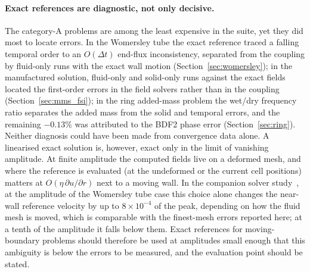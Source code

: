 \paragraph{Exact references are diagnostic, not only decisive.}
The category-A problems are among the least expensive in the suite, yet they did most to locate errors.
In the Womersley tube the exact reference traced a falling temporal order to an $O(\Delta t)$ end-flux inconsistency, separated from the coupling by fluid-only runs with the exact wall motion (Section~\ref{sec:womersley}); in the manufactured solution, fluid-only and solid-only runs against the exact fields located the first-order errors in the field solvers rather than in the coupling (Section~\ref{sec:mms_fsi}); in the ring added-mass problem the wet/dry frequency ratio separates the added mass from the solid and temporal errors, and the remaining $-0.13\%$ was attributed to the BDF2 phase error (Section~\ref{sec:ring}).
Neither diagnosis could have been made from convergence data alone.
A linearised exact solution is, however, exact only in the limit of vanishing amplitude.
At finite amplitude the computed fields live on a deformed mesh, and where the reference is evaluated (at the undeformed or the current cell positions) matters at $O(\eta\,\partial u/\partial r)$ next to a moving wall.
In the companion solver study~\citep{CardiffBatistic2026QM}, at the amplitude of the Womersley tube case this choice alone changes the near-wall reference velocity by up to $8\times10^{-4}$ of the peak, depending on how the fluid mesh is moved, which is comparable with the finest-mesh errors reported here; at a tenth of the amplitude it falls below them.
Exact references for moving-boundary problems should therefore be used at amplitudes small enough that this ambiguity is below the errors to be measured, and the evaluation point should be stated.

